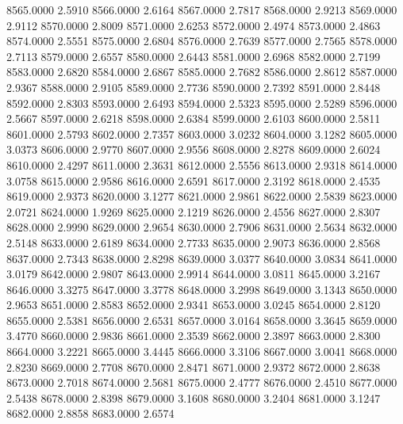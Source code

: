 8565.0000      2.5910
8566.0000      2.6164
8567.0000      2.7817
8568.0000      2.9213
8569.0000      2.9112
8570.0000      2.8009
8571.0000      2.6253
8572.0000      2.4974
8573.0000      2.4863
8574.0000      2.5551
8575.0000      2.6804
8576.0000      2.7639
8577.0000      2.7565
8578.0000      2.7113
8579.0000      2.6557
8580.0000      2.6443
8581.0000      2.6968
8582.0000      2.7199
8583.0000      2.6820
8584.0000      2.6867
8585.0000      2.7682
8586.0000      2.8612
8587.0000      2.9367
8588.0000      2.9105
8589.0000      2.7736
8590.0000      2.7392
8591.0000      2.8448
8592.0000      2.8303
8593.0000      2.6493
8594.0000      2.5323
8595.0000      2.5289
8596.0000      2.5667
8597.0000      2.6218
8598.0000      2.6384
8599.0000      2.6103
8600.0000      2.5811
8601.0000      2.5793
8602.0000      2.7357
8603.0000      3.0232
8604.0000      3.1282
8605.0000      3.0373
8606.0000      2.9770
8607.0000      2.9556
8608.0000      2.8278
8609.0000      2.6024
8610.0000      2.4297
8611.0000      2.3631
8612.0000      2.5556
8613.0000      2.9318
8614.0000      3.0758
8615.0000      2.9586
8616.0000      2.6591
8617.0000      2.3192
8618.0000      2.4535
8619.0000      2.9373
8620.0000      3.1277
8621.0000      2.9861
8622.0000      2.5839
8623.0000      2.0721
8624.0000      1.9269
8625.0000      2.1219
8626.0000      2.4556
8627.0000      2.8307
8628.0000      2.9990
8629.0000      2.9654
8630.0000      2.7906
8631.0000      2.5634
8632.0000      2.5148
8633.0000      2.6189
8634.0000      2.7733
8635.0000      2.9073
8636.0000      2.8568
8637.0000      2.7343
8638.0000      2.8298
8639.0000      3.0377
8640.0000      3.0834
8641.0000      3.0179
8642.0000      2.9807
8643.0000      2.9914
8644.0000      3.0811
8645.0000      3.2167
8646.0000      3.3275
8647.0000      3.3778
8648.0000      3.2998
8649.0000      3.1343
8650.0000      2.9653
8651.0000      2.8583
8652.0000      2.9341
8653.0000      3.0245
8654.0000      2.8120
8655.0000      2.5381
8656.0000      2.6531
8657.0000      3.0164
8658.0000      3.3645
8659.0000      3.4770
8660.0000      2.9836
8661.0000      2.3539
8662.0000      2.3897
8663.0000      2.8300
8664.0000      3.2221
8665.0000      3.4445
8666.0000      3.3106
8667.0000      3.0041
8668.0000      2.8230
8669.0000      2.7708
8670.0000      2.8471
8671.0000      2.9372
8672.0000      2.8638
8673.0000      2.7018
8674.0000      2.5681
8675.0000      2.4777
8676.0000      2.4510
8677.0000      2.5438
8678.0000      2.8398
8679.0000      3.1608
8680.0000      3.2404
8681.0000      3.1247
8682.0000      2.8858
8683.0000      2.6574
